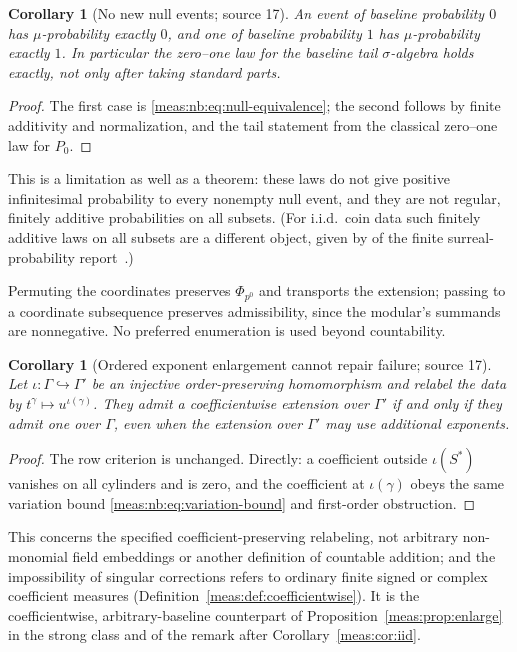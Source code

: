 \documentclass[11pt]{article}
\numberwithin{equation}{section}
\newtheorem{corollary}[theorem]{Corollary}
\theoremstyle{definition}
\theoremstyle{remark}
\begin{document}
\begin{corollary}[No new null events; source 17]\label{meas:nb:cor:null}
An event of baseline probability $0$ has $\mu$-probability exactly $0$, and one of
baseline probability $1$ has $\mu$-probability exactly $1$. In particular the
zero--one law for the baseline tail $\sigma$-algebra holds exactly, not only after
taking standard parts.
\end{corollary}
\begin{proof}
The first case is \eqref{meas:nb:eq:null-equivalence}; the second follows by finite
additivity and normalization, and the tail statement from the classical zero--one
law for $P_0$.
\end{proof}

This is a limitation as well as a theorem: these laws do not give positive
infinitesimal probability to every nonempty null event, and they are not regular,
finitely additive probabilities on all subsets. (For i.i.d.\ coin data such
finitely additive laws on all subsets are a different object, given by
 of the finite surreal-probability
report~\cite{repofsp}.)

Permuting the coordinates preserves $\Phi_{p^0}$ and transports the extension; passing
to a coordinate subsequence preserves admissibility, since the modular's summands
are nonnegative. No preferred enumeration is used beyond countability.

\begin{corollary}[Ordered exponent enlargement cannot repair failure; source 17]
\label{meas:nb:cor:enlargement}
Let $\iota:\Gamma\hookrightarrow\Gamma'$ be an injective order-preserving homomorphism
and relabel the data by $t^\gamma\mapsto u^{\iota(\gamma)}$. They admit a coefficientwise
extension over $\Gamma'$ if and only if they admit one over $\Gamma$, even when the
extension over $\Gamma'$ may use additional exponents.
\end{corollary}
\begin{proof}
The row criterion is unchanged. Directly: a coefficient outside $\iota(S^*)$ vanishes
on all cylinders and is zero, and the coefficient at $\iota(\gamma)$ obeys the same
variation bound \eqref{meas:nb:eq:variation-bound} and first-order obstruction.
\end{proof}

This concerns the specified coefficient-preserving relabeling, not arbitrary
non-monomial field embeddings or another definition of countable addition; and the
impossibility of singular corrections refers to ordinary finite signed or complex
coefficient measures (Definition~\ref{meas:def:coefficientwise}). It is the
coefficientwise, arbitrary-baseline counterpart of Proposition~\ref{meas:prop:enlarge}
in the strong class and of the remark after Corollary~\ref{meas:cor:iid}.
\end{document}
